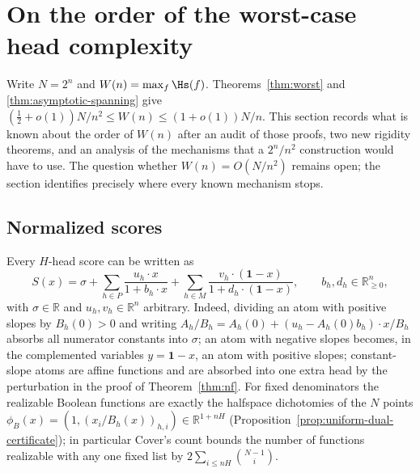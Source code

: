 \section{On the order of the worst-case head complexity}
\label{sec:wn-order}

Write $N=2^n$ and $W(n)=\max_f\Hs(f)$. Theorems~\ref{thm:worst} and
\ref{thm:asymptotic-spanning} give
$(\tfrac12+o(1))N/n^2\le W(n)\le(1+o(1))N/n$. This section records what
is known about the order of $W(n)$ after an audit of those proofs, two
new rigidity theorems, and an analysis of the mechanisms that a
$2^n/n^2$ construction would have to use. The question whether
$W(n)=O(N/n^2)$ remains open; the section identifies precisely where
every known mechanism stops.

\subsection{Normalized scores}
\label{sec:wn-normalized}
Every $H$-head score can be written as
\begin{equation}
\label{eq:wn-normal}
 S(x)=\sigma+\sum_{h\in P}\frac{u_h\cdot x}{1+b_h\cdot x}
          +\sum_{h\in M}\frac{v_h\cdot(\mathbf1-x)}{1+d_h\cdot(\mathbf1-x)},
 \qquad b_h,d_h\in\mathbb R^n_{\ge0},
\end{equation}
with $\sigma\in\mathbb R$ and $u_h,v_h\in\mathbb R^n$ arbitrary.
Indeed, dividing an atom with positive slopes by $B_h(0)>0$ and writing
$A_h/B_h=A_h(0)+(u_h-A_h(0)b_h)\cdot x/B_h$ absorbs all numerator
constants into $\sigma$; an atom with negative slopes becomes, in the
complemented variables $y=\mathbf1-x$, an atom with positive slopes;
constant-slope atoms are affine functions and are absorbed into one
extra head by the perturbation in the proof of Theorem~\ref{thm:nf}.
For fixed denominators the realizable Boolean functions are exactly the
halfspace dichotomies of the $N$ points
$\phi_B(x)=(1,(x_i/B_h(x))_{h,i})\in\mathbb R^{1+nH}$
(Proposition~\ref{prop:uniform-dual-certificate}); in particular
Cover's count bounds the number of functions realizable with any one
fixed list by $2\sum_{i\le nH}\binom{N-1}{i}$.

